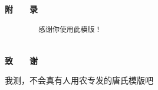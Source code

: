 \documentclass[UTF8,a4paper,12pt]{ctexart}
\begin{document}
	\newpage
	 
	\centerline{\textbf{\fontsize{16pt}{\baselineskip}\heiti 附　　录}}
	\begin{spacing}{1.1}
		\begin{verbatim}
		感谢你使用此模版！
		
		\end{verbatim}
	\end{spacing}
	
	\newpage
	 
	\centerline{\textbf{\fontsize{16pt}{\baselineskip}\heiti 致　　谢}}
	\normalsize
	\vspace{0.4cm}
	我测，不会真有人用农专发的唐氏模版吧
	
\end{document}

